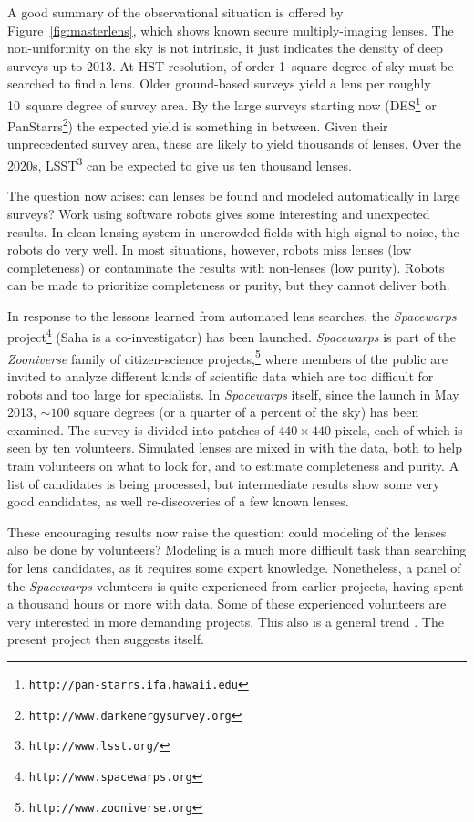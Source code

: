 A good summary of the observational situation is offered by
Figure~\ref{fig:masterlens}, which shows known secure multiply-imaging
lenses.  The non-uniformity on the sky is not intrinsic, it just
indicates the density of deep surveys up to 2013.  At HST resolution,
of order 1~square degree of sky must be searched to find a lens.
Older ground-based surveys yield a lens per roughly 10~square degree
of survey area.  By the large surveys starting now
(DES\footnote{\tt http://pan-starrs.ifa.hawaii.edu} or
PanStarrs\footnote{\tt http://www.darkenergysurvey.org}) the expected
yield is something in between.  Given their unprecedented survey area,
these are likely to yield thousands of lenses.  Over the 2020s,
LSST\footnote{\tt http://www.lsst.org/} can be expected to give us ten
thousand lenses.

The question now arises: can lenses be found and modeled
automatically in large surveys?  Work using software robots
\citep{2009ApJ...694..924M} gives some interesting and unexpected
results.  In clean lensing system in uncrowded fields with high
signal-to-noise, the robots do very well.  In most situations,
however, robots miss lenses (low completeness) or contaminate the
results with non-lenses (low purity).  Robots can be made to
prioritize completeness or purity, but they cannot deliver both.

In response to the lessons learned from automated lens searches, the
{\em Spacewarps\/} project\footnote{\tt http://www.spacewarps.org} 
(Saha is a co-investigator) has been launched.  {\em Spacewarps\/} is
part of the {\em Zooniverse\/} family of citizen-science
projects,\footnote{\tt http://www.zooniverse.org} where members of the
public are invited to analyze different kinds of scientific data which
are too difficult for robots and too large for specialists.  In {\em
 Spacewarps\/} itself, since the launch in May 2013, $\sim100$ square
degrees (or a quarter of a percent of the sky) has been examined.  The
survey is divided into patches of $440\times 440$ pixels, each of
which is seen by ten volunteers.  Simulated lenses are mixed in with
the data, both to help train volunteers on what to look for, and to
estimate completeness and purity.  A list of candidates is being
processed, but intermediate results show some very good candidates, as
well re-discoveries of a few known lenses.

These encouraging results now raise the question: could modeling of
the lenses also be done by volunteers?  Modeling is a much more
difficult task than searching for lens candidates, as it requires some
expert knowledge.  Nonetheless, a panel of the {\em Spacewarps\/}
volunteers is quite experienced from earlier projects, having spent a
thousand hours or more with data.  Some of these experienced
volunteers are very interested in more demanding projects.  This also
is a general trend \citep[cf.][]{Khatib22112011}.  The present project
then suggests itself.

